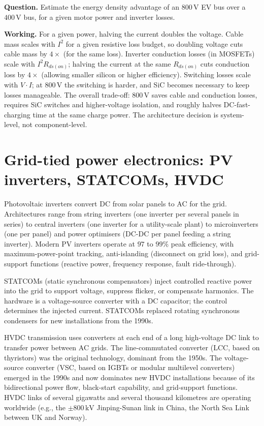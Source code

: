 \begin{estimation}
\textbf{Question.} Estimate the energy density advantage of an $800\,\text{V}$ EV bus over a $400\,\text{V}$ bus, for a given motor power and inverter losses.

\textbf{Working.} For a given power, halving the current doubles the voltage. Cable mass scales with $I^2$ for a given resistive loss budget, so doubling voltage cuts cable mass by $4\times$ (for the same loss). Inverter conduction losses (in MOSFETs) scale with $I^2 R_{ds(on)}$; halving the current at the same $R_{ds(on)}$ cuts conduction loss by $4\times$ (allowing smaller silicon or higher efficiency). Switching losses scale with $V \cdot I$; at $800\,\text{V}$ the switching is harder, and SiC becomes necessary to keep losses manageable. The overall trade-off: $800\,\text{V}$ saves cable and conduction losses, requires SiC switches and higher-voltage isolation, and roughly halves DC-fast-charging time at the same charge power. The architecture decision is system-level, not component-level.
\end{estimation}

\section{Grid-tied power electronics: PV inverters, STATCOMs, HVDC}

Photovoltaic inverters convert DC from solar panels to AC for the grid. Architectures range from string inverters (one inverter per several panels in series) to central inverters (one inverter for a utility-scale plant) to microinverters (one per panel) and power optimisers (DC-DC per panel feeding a string inverter). Modern PV inverters operate at $97$ to $99\%$ peak efficiency, with maximum-power-point tracking, anti-islanding (disconnect on grid loss), and grid-support functions (reactive power, frequency response, fault ride-through).

STATCOMs (static synchronous compensators) inject controlled reactive power into the grid to support voltage, suppress flicker, or compensate harmonics. The hardware is a voltage-source converter with a DC capacitor; the control determines the injected current. STATCOMs replaced rotating synchronous condensers for new installations from the 1990s.

HVDC transmission uses converters at each end of a long high-voltage DC link to transfer power between AC grids. The line-commutated converter (LCC, based on thyristors) was the original technology, dominant from the 1950s. The voltage-source converter (VSC, based on IGBTs or modular multilevel converters) emerged in the 1990s and now dominates new HVDC installations because of its bidirectional power flow, black-start capability, and grid-support functions. HVDC links of several gigawatts and several thousand kilometres are operating worldwide (e.g., the $\pm 800\,\text{kV}$ Jinping-Sunan link in China, the North Sea Link between UK and Norway).

